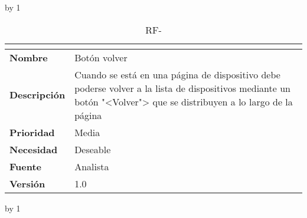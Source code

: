 \advance\rf by 1
\begin{table}[H]
	\caption{RF-\number\rf}
	\begin{tabular}{|l|p{}|}
		\hline
		\multicolumn{2}{|c|}{\cellcolor[HTML]{BFBFBF}{\color[HTML]{000000} \textbf{RF-\number\rf}}} \\ \hline
		\textbf{Nombre}      & Botón volver                                                                                                                                                     \\ \hline
		\textbf{Descripción} & Cuando se está en una página de dispositivo debe poderse volver a la lista de dispositivos mediante un botón "<Volver"> que se distribuyen a lo largo de la página \\ \hline
		\textbf{Prioridad}   & Media                                                                                                                                                            \\ \hline
		\textbf{Necesidad}   & Deseable                                                                                                                                                         \\ \hline
		\textbf{Fuente}      & Analista                                                                                                                                                         \\ \hline
		\textbf{Versión}     & 1.0                                                                                                                                                              \\ \hline
	\end{tabular}
\end{table}
\advance\rf by 1
